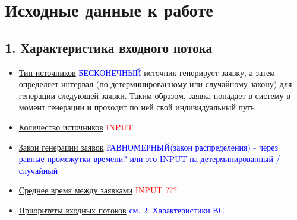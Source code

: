 \documentclass[a4paper,11pt]{report}
\begin{document}
\setcounter{secnumdepth}{-1}

\section{Исходные данные к работе}
\subsection{1. Характеристика входного потока}
\begin{itemize}
  \item \underline{Тип источников} \textcolor{blue}{БЕСКОНЕЧНЫЙ}
  \newline источник генерирует заявку, а затем определяет интервал (по детерминированному или случайному закону) для генерации следующей заявки. Таким образом, заявка попадает в систему в момент генерации и проходит по ней свой индивидуальный путь
  \item \underline{Количество источников} \textcolor{red}{INPUT}
  \item \underline{Закон генерации заявок} \textcolor{blue}{РАВНОМЕРНЫЙ(закон распределения) - через равные промежутки времени? или это INPUT на детерминированный / случайный}
  \item \underline{Среднее время между заявками} \textcolor{red}{INPUT ???}
  \item \underline{Приоритеты входных потоков} \textcolor{blue}{см. 2. Характеристики ВС}
\end{itemize}
\end{document}
